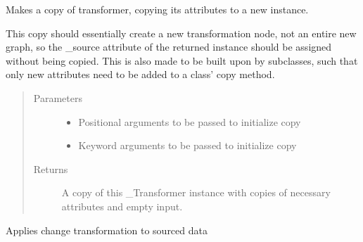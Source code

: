 \documentclass[letterpaper,10pt,english]{sphinxmanual}
\begin{document}
\begin{fulllineitems}
\begin{fulllineitems}
\begin{quote}
\begin{description}
\end{description}\end{quote}

\end{fulllineitems}


\begin{fulllineitems}
\label{\detokenize{dalio.pipe:dalio.pipe.col_generation.Change.copy}}
Makes a copy of transformer, copying its attributes to a new
instance.

This copy should essentially create a new transformation node, not an
entire new graph, so the \_source attribute of the returned instance
should be assigned without being copied. This is also made to be built
upon by subclasses, such that only new attributes need to be added to
a class’ copy method.
\begin{quote}\begin{description}
\item[{Parameters}] \leavevmode\begin{itemize}
\item {} 
 \textendash{} Positional arguments to be passed to initialize copy

\item {} 
 \textendash{} Keyword arguments to be passed to initialize copy

\end{itemize}

\item[{Returns}] \leavevmode
A copy of this \_Transformer instance with copies of necessary
attributes and empty input.

\end{description}\end{quote}

\end{fulllineitems}


\begin{fulllineitems}
\label{\detokenize{dalio.pipe:dalio.pipe.col_generation.Change.transform}}
Applies change transformation to sourced data

\end{fulllineitems}


\end{fulllineitems}
\end{document}
